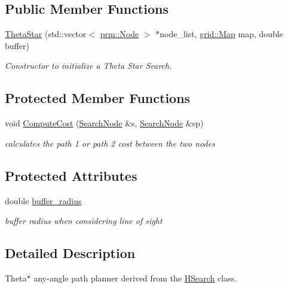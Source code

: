 \subsection*{Public Member Functions}
\begin{DoxyCompactItemize}
\item 
\hyperlink{classhsearch_1_1ThetaStar_a9c3540ce3c1e93b8053eb97e62d71145}{Theta\+Star} (std\+::vector$<$ \hyperlink{structprm_1_1Node}{prm\+::\+Node} $>$ $\ast$node\+\_\+list, \hyperlink{structgrid_1_1Map}{grid\+::\+Map} map, double buffer)
\begin{DoxyCompactList}\small\item\em Constructor to initialize a Theta Star Search. \end{DoxyCompactList}\end{DoxyCompactItemize}
\subsection*{Protected Member Functions}
\begin{DoxyCompactItemize}
\item 
void \hyperlink{classhsearch_1_1ThetaStar_a852af6d668cbb3f58079125ba5740853}{Compute\+Cost} (\hyperlink{structhsearch_1_1SearchNode}{Search\+Node} \&s, \hyperlink{structhsearch_1_1SearchNode}{Search\+Node} \&sp)
\begin{DoxyCompactList}\small\item\em calculates the path 1 or path 2 cost between the two nodes \end{DoxyCompactList}\end{DoxyCompactItemize}
\subsection*{Protected Attributes}
\begin{DoxyCompactItemize}
\item 
\mbox{\label{classhsearch_1_1ThetaStar_aba51580af01b2cdd040b94de00046271}} 
double \hyperlink{classhsearch_1_1ThetaStar_aba51580af01b2cdd040b94de00046271}{buffer\+\_\+radius}
\begin{DoxyCompactList}\small\item\em buffer radius when considering line of sight \end{DoxyCompactList}\end{DoxyCompactItemize}


\subsection{Detailed Description}
Theta$\ast$ any-\/angle path planner derived from the \hyperlink{classhsearch_1_1HSearch}{H\+Search} class. 

